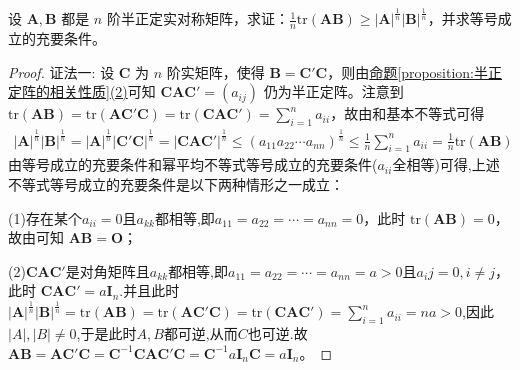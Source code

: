 \documentclass[../../main.tex]{subfiles}
\begin{document}
\begin{proposition}\label{proposition:半正定阵的迹与行列式相关不等式}
设 \(\boldsymbol{A},\boldsymbol{B}\) 都是 \(n\) 阶半正定实对称矩阵，求证：\(\frac{1}{n}\mathrm{tr}(\boldsymbol{A}\boldsymbol{B})\geqslant |\boldsymbol{A}|^{\frac{1}{n}}|\boldsymbol{B}|^{\frac{1}{n}}\)，并求等号成立的充要条件。
\end{proposition}
\begin{proof}
{\color{blue}证法一:}
设 \(\boldsymbol{C}\) 为 \(n\) 阶实矩阵，使得 \(\boldsymbol{B}=\boldsymbol{C}'\boldsymbol{C}\)，则由\hyperref[proposition:半正定阵的相关性质]{命题\ref{proposition:半正定阵的相关性质}(2)}可知 \(\boldsymbol{C}\boldsymbol{A}\boldsymbol{C}'=(a_{ij})\) 仍为半正定阵。注意到 \(\mathrm{tr}(\boldsymbol{A}\boldsymbol{B})=\mathrm{tr}(\boldsymbol{A}\boldsymbol{C}'\boldsymbol{C})=\mathrm{tr}(\boldsymbol{C}\boldsymbol{A}\boldsymbol{C}')=\sum_{i = 1}^{n}a_{ii}\)，故由和基本不等式可得
\begin{align*}
|\boldsymbol{A}|^{\frac{1}{n}}|\boldsymbol{B}|^{\frac{1}{n}}=|\boldsymbol{A}|^{\frac{1}{n}}|\boldsymbol{C}'\boldsymbol{C}|^{\frac{1}{n}}=|\boldsymbol{C}\boldsymbol{A}\boldsymbol{C}'|^{\frac{1}{n}}\leqslant (a_{11}a_{22}\cdots a_{nn})^{\frac{1}{n}}\leqslant \frac{1}{n}\sum_{i = 1}^{n}a_{ii}=\frac{1}{n}\mathrm{tr}(\boldsymbol{A}\boldsymbol{B})
\end{align*}
由等号成立的充要条件和幂平均不等式等号成立的充要条件($a_{ii}$全相等)可得,上述不等式等号成立的充要条件是以下两种情形之一成立：

(1)存在某个$a_{ii}=0$且$a_{kk}$都相等,即\(a_{11}=a_{22}=\cdots=a_{nn}=0\)，此时 \(\mathrm{tr}(\boldsymbol{A}\boldsymbol{B}) = 0\)，故由可知 \(\boldsymbol{A}\boldsymbol{B}=\boldsymbol{O}\)；

(2)$\boldsymbol{C}\boldsymbol{A}\boldsymbol{C}'$是对角矩阵且$a_{kk}$都相等,即\(a_{11}=a_{22}=\cdots=a_{nn}=a>0\)且$a_ij=0,i\ne j$，此时
\(\boldsymbol{C}\boldsymbol{A}\boldsymbol{C}'=a\boldsymbol{I}_n\).并且此时\(|\boldsymbol{A}|^{\frac{1}{n}}|\boldsymbol{B}|^{\frac{1}{n}}=\mathrm{tr}(\boldsymbol{A}\boldsymbol{B})=\mathrm{tr}(\boldsymbol{A}\boldsymbol{C}'\boldsymbol{C})=\mathrm{tr}(\boldsymbol{C}\boldsymbol{A}\boldsymbol{C}')=\sum_{i = 1}^{n}a_{ii}=na>0\),因此$|A|,|B|\ne0$,于是此时$A,B$都可逆,从而$C$也可逆.故 \(\boldsymbol{AB}=\boldsymbol{AC}' \boldsymbol{C}=\boldsymbol{C}^{-1}\boldsymbol{CAC}' \boldsymbol{C}=\boldsymbol{C}^{-1}a\boldsymbol{I}_n\boldsymbol{C}=a\boldsymbol{I}_n\)。


\end{proof}
\end{document}
